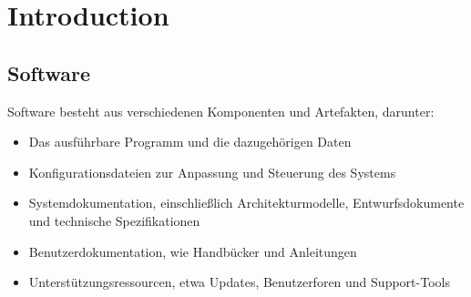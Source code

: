 \section{Introduction}
\subsection{Software}
\begin{definition}[Software]
    Software besteht aus verschiedenen Komponenten und Artefakten, darunter:
    \begin{itemize}
        \item Das ausführbare Programm und die dazugehörigen Daten
        \item Konfigurationsdateien zur Anpassung und Steuerung des Systems
        \item Systemdokumentation, einschließlich Architekturmodelle, Entwurfsdokumente und technische Spezifikationen
        \item Benutzerdokumentation, wie Handbücker und Anleitungen
        \item Unterstützungsressourcen, etwa Updates, Benutzerforen und Support-Tools
    \end{itemize}
\end{definition}
